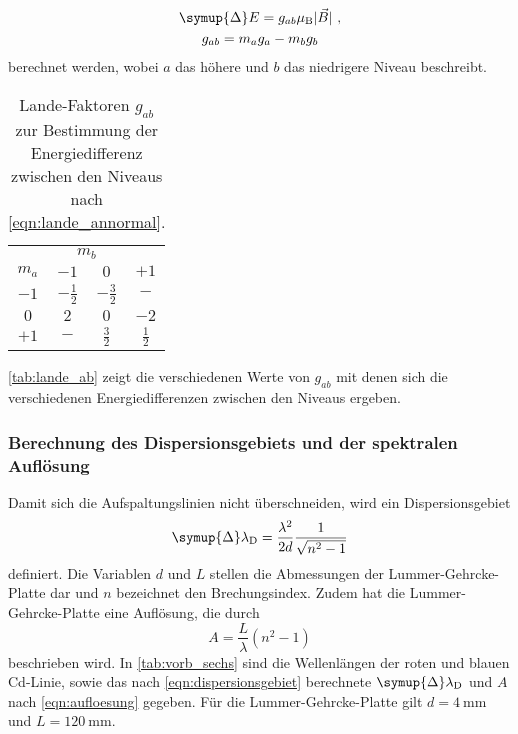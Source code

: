     \begin{gather}
        \symup{\Delta} E = g_{ab} \mu_\text{B} \lvert \vec{B} \rvert \ , 
        \label{eqn:energiedifferenz_annormal}\\
        g_{ab} = m_a g_a - m_b g_b 
        \label{eqn:lande_annormal}
    \end{gather}
    berechnet werden,
    wobei $a$ das höhere und $b$ das niedrigere Niveau beschreibt.
    \begin{table}
        \centering
        \caption{Lande-Faktoren $g_{ab}$ zur Bestimmung der Energiedifferenz zwischen den Niveaus nach \autoref{eqn:lande_annormal}.}
        \label{tab:lande_ab}
        \begin{tabular}{c c c c}
            \toprule
            & \multicolumn{2}{c}{$m_b$}  \\
            \cmidrule(lr){2-4}
            {$m_a$} & {$-1$} & {$0$} & {$+1$} \\
            \midrule
            $-1$ & $- \frac{1}{2}$ & $- \frac{3}{2}$ & $-$ \\
            $0$ &  $2$ & $0$ & $-2$ \\
            $+1$ & $-$ & $\frac{3}{2}$ & $\frac{1}{2}$ \\
            \bottomrule
        \end{tabular}
    \end{table}
    \autoref{tab:lande_ab} zeigt die verschiedenen Werte von $g_{ab}$ mit denen sich die verschiedenen Energiedifferenzen zwischen den Niveaus ergeben.

\subsubsection{Berechnung des Dispersionsgebiets und der spektralen Auflösung}

    Damit sich die Aufspaltungslinien nicht überschneiden,
    wird ein Dispersionsgebiet 
    \begin{equation}
        \symup{\Delta}\lambda_\text{D} = \frac{\lambda^2}{2d} \frac{1}{\sqrt{n^2 - 1}}
        \label{eqn:dispersionsgebiet}
    \end{equation}
    definiert.
    Die Variablen $d$ und $L$ stellen die Abmessungen der Lummer-Gehrcke-Platte dar und $n$ bezeichnet den Brechungsindex.
    Zudem hat die Lummer-Gehrcke-Platte eine Auflösung,
    die durch
    \begin{equation}
        A = \frac{L}{\lambda} (n^2 -1)
        \label{eqn:aufloesung}
    \end{equation}
    beschrieben wird.
    In \autoref{tab:vorb_sechs} sind die Wellenlängen der roten und blauen Cd-Linie,
    sowie das nach \autoref{eqn:dispersionsgebiet} berechnete $\symup{\Delta}\lambda_\text{D}$ und $A$ nach \autoref{eqn:aufloesung} gegeben.
    Für die Lummer-Gehrcke-Platte gilt $d = \SI{4}{\milli\meter}$ und $L = \SI{120}{\milli\meter}$.

